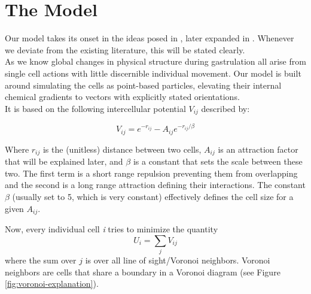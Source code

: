 

\section{The Model}

Our model takes its onset in the ideas posed in , later expanded in . Whenever we deviate from the existing literature, this will be stated clearly.\\

As we know global changes in physical structure during gastrulation all arise from single cell actions with little discernible individual movement. Our model is built around simulating the cells as point-based particles, elevating their internal chemical gradients to vectors with explicitly stated orientations. \\
It is based on the following intercellular potential $V_{ij}$ described by: 

\begin{equation}
    V_{ij}=e^{-r_{ij}}-A_{ij} e^{-r_{ij}/\beta}
    \label{eq:main-pot}
\end{equation}

Where $r_{ij}$ is the (unitless) distance between two cells, $A_{ij}$ is an attraction factor that will be explained later, and $\beta$ is a constant that sets the scale between these two. The first term is a short range repulsion preventing them from overlapping and the second is a long range attraction defining their interactions. The constant $\beta$ (usually set to 5, which is very constant) effectively defines the cell size for a given $A_{ij}$. 

Now, every individual cell \textit{i} tries to minimize the quantity 
\begin{equation}
    U_i = \sum_j V_{ij}
    \label{eq:totalPot}
\end{equation}
where the sum over $j$ is over all line of sight/Voronoi neighbors. Voronoi neighbors are cells that share a boundary in a Voronoi diagram (see Figure \ref{fig:voronoi-explanation}). 

